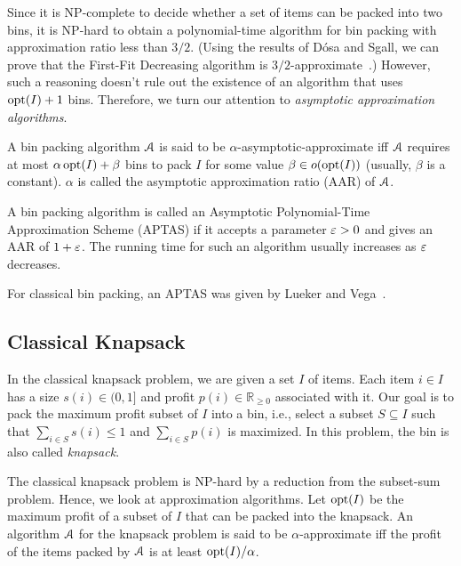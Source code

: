 Since it is NP-complete to decide whether a set of items can be packed into two bins,
it is NP-hard to obtain a polynomial-time algorithm for bin packing
with approximation ratio less than $3/2$.
(Using the results of D\'osa and Sgall, we can prove that the First-Fit Decreasing algorithm
is $3/2$-approximate~\cite{dosa2013first,dosa2007tight}.)
However, such a reasoning doesn't rule out the existence of an algorithm
that uses $\operatorname{opt}(I) + 1$ bins.
Therefore, we turn our attention to \emph{asymptotic approximation algorithms}.
\begin{definition}
A bin packing algorithm $\mathcal{A}$ is said to be $\alpha$-asymptotic-approximate iff
$\mathcal{A}$ requires at most $\alpha\operatorname{opt}(I) + \beta$ bins to pack $I$
for some value $\beta \in o(\operatorname{opt}(I))$ (usually, $\beta$ is a constant).
$\alpha$ is called the asymptotic approximation ratio (AAR) of $\mathcal{A}$.
\end{definition}
\begin{definition}[APTAS]
A bin packing algorithm is called an Asymptotic Polynomial-Time Approximation Scheme (APTAS)
if it accepts a parameter $\varepsilon > 0$ and gives an AAR of $1+\varepsilon$.
The running time for such an algorithm usually increases as $\varepsilon$ decreases.
\end{definition}

For classical bin packing, an APTAS was given by Lueker and Vega~\cite{bp-aptas}.

\subsection{Classical Knapsack}

In the classical knapsack problem, we are given a set $I$ of items.
Each item $i \in I$ has a size $s(i) \in (0, 1]$
and profit $p(i) \in \mathbb{R}_{\ge 0}$ associated with it.
Our goal is to pack the maximum profit subset of $I$ into a bin,
i.e., select a subset $S \subseteq I$ such that
$\sum_{i \in S} s(i) \le 1$ and $\sum_{i \in S} p(i)$ is maximized.
In this problem, the bin is also called \emph{knapsack}.

The classical knapsack problem is NP-hard by a reduction from the subset-sum problem.
Hence, we look at approximation algorithms.
Let $\operatorname{opt}(I)$ be the maximum profit of a subset of $I$ that can be packed into the knapsack.
An algorithm $\mathcal{A}$ for the knapsack problem is said to be $\alpha$-approximate iff
the profit of the items packed by $\mathcal{A}$ is at least $\operatorname{opt}(I)/\alpha$.

